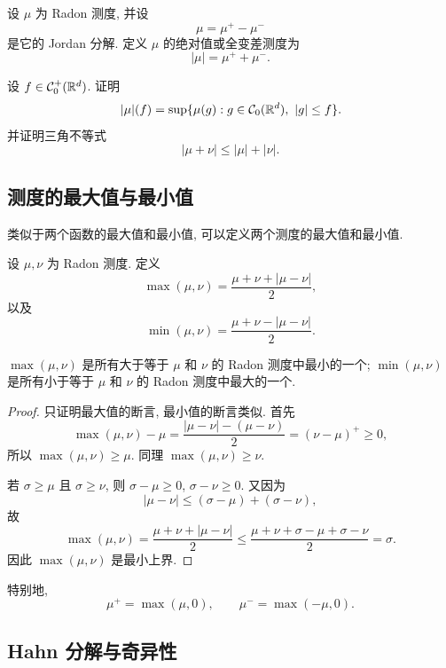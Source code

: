 \begin{defn}[全变差测度]
	\label{def:total-variation-measure}
	设 \(\mu\) 为 Radon 测度, 并设
	\[
	\mu=\mu^+-\mu^-
	\]
	是它的 Jordan 分解. 定义 \(\mu\) 的绝对值或全变差测度为
	\[
	|\mu|=\mu^++\mu^-.
	\]
\end{defn}

\begin{exer}
	\label{exer:total-variation-characterization}
	设 \(f\in\mathcal{C}_0^+(\mathbb{R}^d)\). 证明
	\[
	|\mu|(f)=\sup\{\mu(g):g\in\mathcal{C}_0(\mathbb{R}^d),\ |g|\leq f\}.
	\]
	并证明三角不等式
	\[
	|\mu+\nu|\leq |\mu|+|\nu|.
	\]
\end{exer}

\subsection{测度的最大值与最小值}

类似于两个函数的最大值和最小值, 可以定义两个测度的最大值和最小值.

\begin{defn}[测度的最大值与最小值]
	\label{def:max-min-radon-measures}
	设 \(\mu,\nu\) 为 Radon 测度. 定义
	\[
	\max(\mu,\nu)=\frac{\mu+\nu+|\mu-\nu|}{2},
	\]
	以及
	\[
	\min(\mu,\nu)=\frac{\mu+\nu-|\mu-\nu|}{2}.
	\]
\end{defn}

\begin{thm}
	\label{thm:max-min-measures-order-property}
	\(\max(\mu,\nu)\) 是所有大于等于 \(\mu\) 和 \(\nu\) 的 Radon 测度中最小的一个; \(\min(\mu,\nu)\) 是所有小于等于 \(\mu\) 和 \(\nu\) 的 Radon 测度中最大的一个.
\end{thm}

\begin{proof}
	只证明最大值的断言, 最小值的断言类似. 首先
	\[
	\max(\mu,\nu)-\mu
	=
	\frac{|\mu-\nu|-(\mu-\nu)}{2}
	=(\nu-\mu)^+\geq0,
	\]
	所以 \(\max(\mu,\nu)\geq\mu\). 同理 \(\max(\mu,\nu)\geq\nu\).
	
	若 \(\sigma\geq\mu\) 且 \(\sigma\geq\nu\), 则 \(\sigma-\mu\geq0\), \(\sigma-\nu\geq0\). 又因为
	\[
	|\mu-\nu|\leq (\sigma-\mu)+(\sigma-\nu),
	\]
	故
	\[
	\max(\mu,\nu)
	=
	\frac{\mu+\nu+|\mu-\nu|}{2}
	\leq
	\frac{\mu+\nu+\sigma-\mu+\sigma-\nu}{2}
	=\sigma.
	\]
	因此 \(\max(\mu,\nu)\) 是最小上界.
\end{proof}

特别地,
\[
\mu^+=\max(\mu,0),
\qquad
\mu^-=\max(-\mu,0).
\]

\subsection{Hahn 分解与奇异性}

